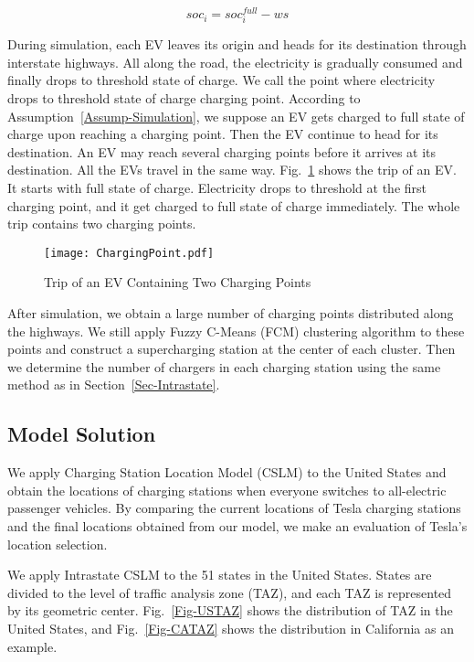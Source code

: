 \documentclass{mcmthesis}
\begin{document}
\begin{equation}\label{Eqn-StateOfCharge}
soc_{i}=soc_{i}^{full}-ws
\end{equation}

During simulation, each EV leaves its origin and heads for its destination through interstate highways. All along the road, the electricity is gradually consumed and finally drops to threshold state of charge. We call the point where electricity drops to threshold state of charge charging point. According to Assumption~\ref{Assump-Simulation}, we suppose an EV gets charged to full state of charge upon reaching a charging point. Then the EV continue to head for its destination. An EV may reach several charging points before it arrives at its destination. All the EVs travel in the same way. Fig.~\ref{Fig-ChargingPointExample} shows the trip of an EV. It starts with full state of charge. Electricity drops to threshold at the first charging point, and it get charged to full state of charge immediately. The whole trip contains two charging points.

\begin{figure}[htbp]
  \centering
  \texttt{[image: ChargingPoint.pdf]}
  \caption{Trip of an EV Containing Two Charging Points}\label{Fig-ChargingPointExample}
\end{figure}

After simulation, we obtain a large number of charging points distributed along the highways. We still apply Fuzzy C-Means (FCM) clustering algorithm to these points and construct a supercharging station at the center of each cluster. Then we determine the number of chargers in each charging station using the same method as in Section~\ref{Sec-Intrastate}.
\subsection{Model Solution}
We apply Charging Station Location Model (CSLM) to the United States and obtain the locations of charging stations when everyone switches to all-electric passenger vehicles. By comparing the current locations of Tesla charging stations and the final locations obtained from our model, we make an evaluation of Tesla's location selection.

We apply Intrastate CSLM to the 51 states in the United States. States are divided to the level of traffic analysis zone (TAZ), and each TAZ is represented by its geometric center. Fig.~\ref{Fig-USTAZ} shows the distribution of TAZ in the United States, and Fig.~\ref{Fig-CATAZ} shows the distribution in California as an example.
\end{document}
